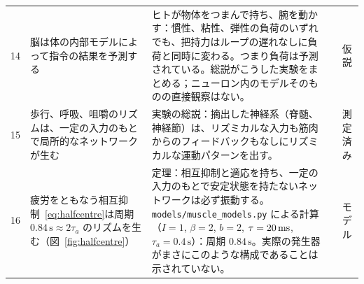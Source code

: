 {\begin{longtable}{>{\raggedright}p{0.5cm}>{\raggedright}p{4.0cm}>{\raggedright}p{5.6cm}>{\raggedright}p{2.3cm}>{\raggedright\arraybackslash}p{1.7cm}}
14 & 脳は体の内部モデルによって指令の結果を予測する & ヒトが物体をつまんで持ち、腕を動かす：慣性、粘性、弾性の負荷のいずれでも、把持力はループの遅れなしに負荷と同時に変わる。つまり負荷は予測されている。総説がこうした実験をまとめる；ニューロン内のモデルそのものの直接観察はない。 & \cite{FlanaganWing1997grip, WolpertGhahramani2000} & 仮説 \\
15 & 歩行、呼吸、咀嚼のリズムは、一定の入力のもとで局所的なネットワークが生む & 実験の総説：摘出した神経系（脊髄、神経節）は、リズミカルな入力も筋肉からのフィードバックもなしにリズミカルな運動パターンを出す。 & \cite{MarderBucher2001} & 測定済み \\
16 & 疲労をともなう相互抑制~\eqref{eq:halfcentre}は周期 $0.84\,\text{s}\approx2\tau_a$ のリズムを生む（図~\ref{fig:halfcentre}） & 定理：相互抑制と適応を持ち、一定の入力のもとで安定状態を持たないネットワークは必ず振動する。\texttt{models/\allowbreak muscle\_\allowbreak models.py} による計算（$I=1$, $\beta=2$, $b=2$, $\tau=20\,\text{ms}$, $\tau_a=0.4\,\text{s}$）：周期 $0.84\,\text{s}$。実際の発生器がまさにこのような構成であることは示されていない。 & \cite{Matsuoka1985osc} & モデル \\
\bottomrule
\end{longtable}}
